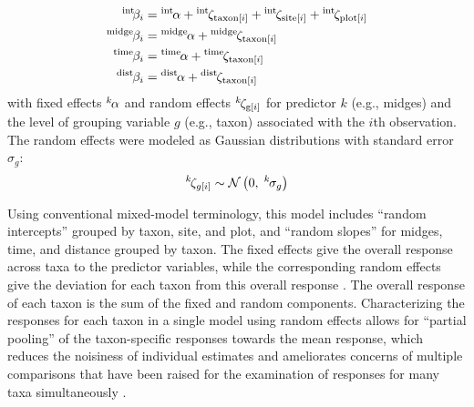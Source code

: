 \begin{equation} \label{eq:betas}
\begin{split}
    {}^\text{int}\hspace*{-2pt}\beta_i &= {}^\text{int}\hspace*{-1pt}\alpha +
        {}^\text{int}\hspace*{-1pt}\zeta_{\text{taxon}[i]} +
        {}^\text{int}\hspace*{-1pt}\zeta_{\text{site}[i]} +
        {}^\text{int}\hspace*{-1pt}\zeta_{\text{plot}[i]} \\
    {}^\text{midge}\hspace*{-1pt}\beta_i &= {}^\text{midge}\hspace*{-1pt}\alpha +
            {}^\text{midge}\hspace*{-1pt}\zeta_{\text{taxon}[i]} \\
    {}^\text{time}\hspace*{-1pt}\beta_i &= {}^\text{time}\hspace*{-1pt}\alpha +
            {}^\text{time}\hspace*{-1pt}\zeta_{\text{taxon}[i]} \\
    {}^\text{dist}\hspace*{-1pt}\beta_i &= {}^\text{dist}\hspace*{-1pt}\alpha +
            {}^\text{dist}\hspace*{-1pt}\zeta_{\text{taxon}[i]}
\end{split}
\end{equation}
%
\noindent with fixed effects ${}^k\hspace*{-1pt}\alpha$ and random effects
${}^k\hspace*{-1pt}\zeta_{\text{g}[i]}$ for predictor $k$ (e.g., midges)
and the level of grouping variable $g$ (e.g., taxon) associated  with the $i$th observation.
The random effects were modeled as Gaussian distributions with
standard error $\sigma_g$:
%
\begin{equation} \label{eq:zetas}
    {}^k\hspace*{-1pt}\zeta_{g[i]} \sim
        \mathcal{N}\left(0, \; {}^k\hspace*{-1pt}\sigma_g \right)
\end{equation}

Using conventional mixed-model terminology, this model includes ``random intercepts''
grouped by taxon, site, and plot, and ``random slopes'' for midges,
time, and distance grouped by taxon.
The fixed effects give the overall response across taxa to the predictor variables,
while the corresponding random effects give the deviation for each taxon from
this overall response \citep{Jackson2012}.
The overall response of each taxon is the sum of the fixed and random components.
Characterizing the responses for each taxon in a single model using random effects
allows for ``partial pooling'' of the taxon-specific responses towards the mean response,
which reduces the noisiness of individual estimates and ameliorates concerns of
multiple comparisons \citep{Gelman2012} that have been raised
for the examination of responses for many taxa simultaneously \citep{Mcgarigal2013}.

